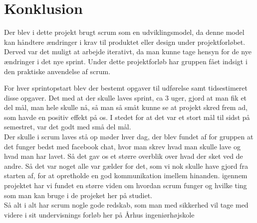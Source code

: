 \chapter{Konklusion}
Der blev i dette projekt brugt scrum som en udviklingsmodel, da denne model kan håndtere ændringer i krav til produktet eller design under projektforløbet. Derved var det muligt at arbejde iterativt, da man kunne tage hensyn for de nye ændringer i det nye sprint. \newline
\noindent Under dette projektforløb har gruppen fået indsigt i den praktiske anvendelse af scrum.

 For hver sprintopstart blev der bestemt opgaver til udførelse samt tidsestimeret disse opgaver. Det med at der skulle laves sprint, ca 3 uger, gjord at man fik et del mål, man hele skulle nå, så man så småt kunne se at projekt skred frem ad, som havde en positiv effekt på os. I stedet for at det var et stort mål til sidst på semestret, var det godt med små del mål. \\Der skulle i scrum laves stå op møder hver dag, der blev fundet af for gruppen at det funger bedst med facebook chat, hvor man skrev hvad man skulle lave og hvad man har lavet. Så det gav os et større overblik over hvad der sket ved de andre. Så det var noget alle var gælder for det, som vi nok skulle have gjord fra starten af, for at opretholde  en god kommunikation imellem hinanden. igennem projektet har vi fundet en større viden om hvordan scrum funger og hvilke ting som man kan bruge i de projeket her på studiet. 
\\Så alt i alt har scrum nogle gode redskab, som man med sikkerhed vil tage med videre i sit undervisnings forløb her på Århus ingeniørhøjskole 
 



 



